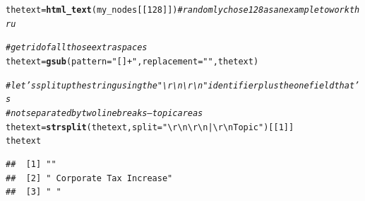 \documentclass{article}\usepackage[]{graphicx}\usepackage[]{color}
\makeatletter
\newcommand{\hlnum}[1]{\textcolor[rgb]{0.686,0.059,0.569}{#1}}%
\newcommand{\hlstr}[1]{\textcolor[rgb]{0.192,0.494,0.8}{#1}}%
\newcommand{\hlcom}[1]{\textcolor[rgb]{0.678,0.584,0.686}{\textit{#1}}}%
\newcommand{\hlstd}[1]{\textcolor[rgb]{0.345,0.345,0.345}{#1}}%
\newcommand{\hlkwb}[1]{\textcolor[rgb]{0.69,0.353,0.396}{#1}}%
\newcommand{\hlkwc}[1]{\textcolor[rgb]{0.333,0.667,0.333}{#1}}%
\newcommand{\hlkwd}[1]{\textcolor[rgb]{0.737,0.353,0.396}{\textbf{#1}}}%
\newenvironment{kframe}{%
 \def\at@end@of@kframe{}%
 \ifinner\ifhmode%
  \def\at@end@of@kframe{\end{minipage}}%
  \begin{minipage}{\columnwidth}%
 \fi\fi%
 \def\FrameCommand##1{\hskip\@totalleftmargin \hskip-\fboxsep
 \colorbox{shadecolor}{##1}\hskip-\fboxsep
     \hskip-\linewidth \hskip-\@totalleftmargin \hskip\columnwidth}%
 \MakeFramed {\advance\hsize-\width
   \@totalleftmargin\z@ \linewidth\hsize
   \@setminipage}}%
 {\par\unskip\endMakeFramed%
 \at@end@of@kframe}
\newenvironment{knitrout}{}{} %
\makeatother
\begin{document}
\begin{knitrout}
\color{fgcolor}\begin{kframe}
\begin{alltt}
\hlstd{thetext} \hlkwb{=} \hlkwd{html_text}\hlstd{(my_nodes[[}\hlnum{128}\hlstd{]])}  \hlcom{# randomly chose 128 as an example to work thru}

\hlcom{# get rid of all those extra spaces}
\hlstd{thetext} \hlkwb{=} \hlkwd{gsub}\hlstd{(}\hlkwc{pattern} \hlstd{=} \hlstr{"[ ]+"}\hlstd{,} \hlkwc{replacement} \hlstd{=} \hlstr{" "}\hlstd{, thetext)}

\hlcom{# let's split up the string using the "\textbackslash{}r\textbackslash{}n \textbackslash{}r\textbackslash{}n" identifier plus the one field that's }
\hlcom{# not separated by two line breaks -- topic areas}
\hlstd{thetext} \hlkwb{=} \hlkwd{strsplit}\hlstd{(thetext,} \hlkwc{split}\hlstd{=} \hlstr{"\textbackslash{}r\textbackslash{}n \textbackslash{}r\textbackslash{}n|\textbackslash{}r\textbackslash{}n Topic"}\hlstd{)[[}\hlnum{1}\hlstd{]]}
\hlstd{thetext}
\end{alltt}
\begin{verbatim}
##  [1] ""                                                                                                                                                                                                                                                                                                                                                                                                                                                                                      
##  [2] " Corporate Tax Increase"                                                                                                                                                                                                                                                                                                                                                                                                                                                               
##  [3] " "                                                                                                                                                                                                                                                                                                                                                                                                                                                                                     

\end{verbatim}
\end{kframe}
\end{knitrout}
\end{document}
